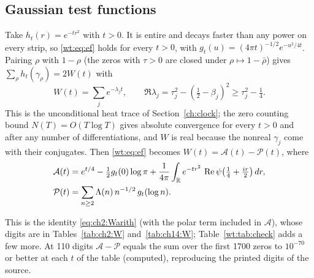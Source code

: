 \subsection*{Gaussian test functions}
Take $h_t(r)=e^{-tr^2}$ with $t>0$. It is entire and decays faster than any power on every strip, so \eqref{wt:eq:ef} holds for every $t>0$, with $g_t(u)=(4\pi t)^{-1/2}e^{-u^2/4t}$. Pairing $\rho$ with $1-\rho$ (the zeros with $\tau>0$ are closed under $\rho\mapsto1-\bar\rho$) gives $\sum_\rho h_t(\gamma_\rho)=2W(t)$ with
\[
W(t)=\sum_je^{-\lambda_jt},\qquad \Re\lambda_j=\tau_j^2-(\tfrac12-\beta_j)^2\ge\tau_j^2-\tfrac14 .
\]
This is the unconditional heat trace of Section~\ref{ch:clock}; the zero counting bound $N(T)=O(T\log T)$ gives absolute convergence for every $t>0$ and after any number of differentiations, and $W$ is real because the nonreal $\gamma_j$ come with their conjugates. Then \eqref{wt:eq:ef} becomes $W(t)=\mathcal A(t)-\mathcal P(t)$, where
\begin{align}
\mathcal A(t)&=e^{t/4}-\tfrac12g_t(0)\log\pi+\frac1{4\pi}\int_{\mathbb{R}}e^{-tr^2}\,\operatorname{Re}\psi\big(\tfrac14+\tfrac{ir}2\big)\,dr,\label{wt:eq:A}\\
\mathcal P(t)&=\sum_{n\ge2}\Lambda(n)\,n^{-1/2}\,g_t(\log n).\label{wt:eq:P}
\end{align}
\begin{resultpar}\label{wt:res:check}
This is the identity \eqref{eq:ch2:Warith} (with the polar term included in $\mathcal A$), whose digits are in Tables~\ref{tab:ch2:W} and~\ref{tab:ch14:W}; Table~\ref{wt:tab:check} adds a few more. At 110 digits $\mathcal A-\mathcal P$ equals the sum over the first 1700 zeros to $10^{-70}$ or better at each $t$ of the table (computed), reproducing the printed digits of the source.\end{resultpar}

\begin{table}[h]\centering\small
{}
\caption{The explicit formula for the heat trace, agreeing to all printed digits (computed).}\label{wt:tab:check}
\end{table}

